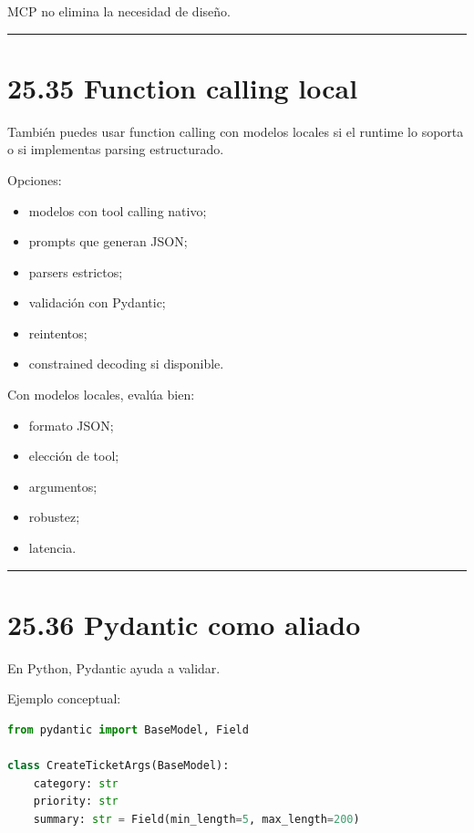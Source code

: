 MCP no elimina la necesidad de diseño.

\begin{center}\rule{0.5\linewidth}{0.5pt}\end{center}

\section{25.35 Function calling local}\label{function-calling-local}

También puedes usar function calling con modelos locales si el runtime
lo soporta o si implementas parsing estructurado.

Opciones:

\begin{itemize}
\tightlist
\item
  modelos con tool calling nativo;
\item
  prompts que generan JSON;
\item
  parsers estrictos;
\item
  validación con Pydantic;
\item
  reintentos;
\item
  constrained decoding si disponible.
\end{itemize}

Con modelos locales, evalúa bien:

\begin{itemize}
\tightlist
\item
  formato JSON;
\item
  elección de tool;
\item
  argumentos;
\item
  robustez;
\item
  latencia.
\end{itemize}

\begin{center}\rule{0.5\linewidth}{0.5pt}\end{center}

\section{25.36 Pydantic como aliado}\label{pydantic-como-aliado}

En Python, Pydantic ayuda a validar.

Ejemplo conceptual:

\begin{lstlisting}[language=Python]
from pydantic import BaseModel, Field

class CreateTicketArgs(BaseModel):
    category: str
    priority: str
    summary: str = Field(min_length=5, max_length=200)
\end{lstlisting}

